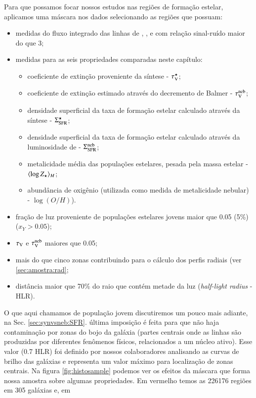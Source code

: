 Para que possamos focar nossos estudos nas regiões de formação estelar, aplicamos uma máscara nos
dados selecionando as regiões que possuam:
\begin{itemize}
  \setlength\itemsep{0.2cm}
  \item medidas do fluxo integrado das linhas de \Hbeta, \oIII, \Halpha e \nII com relação
sinal-ruído maior do que 3;
  \item medidas para as seis propriedades comparadas neste capítulo:
  \begin{itemize}
    \item coeficiente de extinção proveniente da síntese - $\tau_{\mathrm{V}}^\star$;
    \item coeficiente de extinção estimado através do decremento de Balmer - $\tau_{\mathrm{V}}^{\mathrm{neb}}$;
    \item densidade superficial da taxa de formação estelar calculado através da síntese -
$\Sigma_{\mathrm{SFR}}^\star$;
	\item densidade superficial da taxa de formação estelar calculado através da luminosidade de
\Halpha - $\Sigma_{\mathrm{SFR}}^{\mathrm{neb}}$;
	\item metalicidade média das populações estelares, pesada pela massa estelar - $\meanM{\log
Z_\star}$;
	\item abundância de oxigênio (utilizada como medida de metalicidade nebular) - $\log(O/H)$).
  \end{itemize}
  \item fração de luz proveniente de populações estelares jovens maior que 0.05 (5\%) ($x_Y >
0.05$);
  \item $\tau_{\mathrm{V}}$ e $\tau_{\mathrm{V}}^{\mathrm{neb}}$ maiores que 0.05;
  \item mais do que cinco zonas contribuindo para o cálculo dos perfis radiais (ver
\ref{sec:amostra:rad};
  \item distância maior que 70\% do raio que contém metade da luz ({\em half-light radius} - HLR).
\end{itemize}
\noindent O que aqui chamamos de população jovem discutiremos um pouco mais adiante, na Sec.
\ref{sec:synvsneb:SFR}. última imposição é feita para que não haja contaminação por zonas
do bojo da galáxia (partes centrais onde as linhas são produzidas por diferentes fenômenos físicos,
relacionados a um núcleo ativo). Esse valor (0.7 HLR) foi definido por nossos colaboradores
analisando as curvas de brilho das galáxias e representa um valor máximo para localização de zonas
centrais. Na figura \ref{fig:histosample} podemos ver os efeitos da máscara que forma nossa
amostra sobre algumas propriedades. Em vermelho temos as 226176 regiões em 305 galáxias e, em
